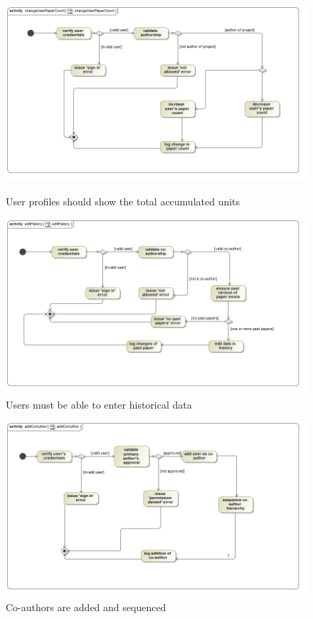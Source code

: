 \documentclass[a4paper,12pt]{report}
\begin{document}
\begin{figure}[ht]
\includegraphics[scale=0.5]{act__changeUserPaperCount__changeUserPaperCount.jpg} 
\caption{User profiles should show the total accumulated units}


\includegraphics[scale=0.5]{act__editHistory__editHistory.jpg} 
\caption{Users must be able to enter historical data}

\end{figure}
\newpage
\begin{figure}[ht]
\includegraphics[scale=0.5]{act__addCoAuthor__addCoAuthor.jpg}  
\caption{Co-authors are added and sequenced}


\end{figure}
\end{document}
